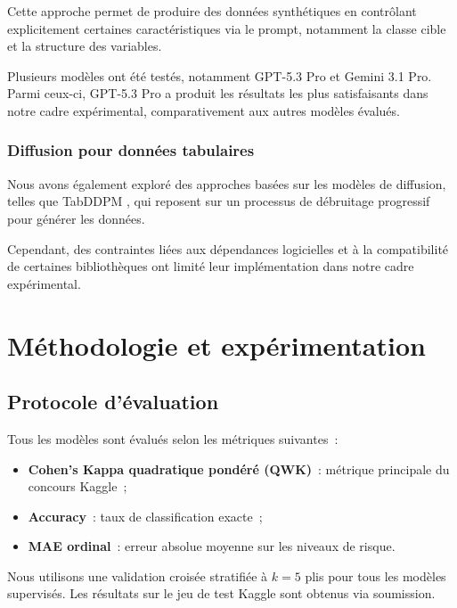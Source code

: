 \documentclass[conference]{IEEEtran}
\begin{document}
Cette approche permet de produire des données synthétiques en contrôlant explicitement certaines caractéristiques via le prompt, notamment la classe cible et la structure des variables.

Plusieurs modèles ont été testés, notamment GPT-5.3 Pro et Gemini 3.1 Pro. Parmi ceux-ci, GPT-5.3 Pro a produit les résultats les plus satisfaisants dans notre cadre expérimental, comparativement aux autres modèles évalués.\\

\subsubsection{\textbf{Diffusion pour données tabulaires}}

Nous avons également exploré des approches basées sur les modèles de diffusion, telles que TabDDPM \cite{kotelnikov2023tabddpm}, qui reposent sur un processus de débruitage progressif pour générer les données.

Cependant, des contraintes liées aux dépendances logicielles et à la compatibilité de certaines bibliothèques ont limité leur implémentation dans notre cadre expérimental.


\section{Méthodologie et expérimentation}
\label{sec:methodo}

\subsection{Protocole d'évaluation}

Tous les modèles sont évalués selon les métriques suivantes~:
\begin{itemize}
  \item \textbf{Cohen's Kappa quadratique pondéré (QWK)}~: métrique principale du concours Kaggle~;
  \item \textbf{Accuracy}~: taux de classification exacte~;
  \item \textbf{MAE ordinal}~: erreur absolue moyenne sur les niveaux de risque.
\end{itemize}

Nous utilisons une validation croisée stratifiée à $k=5$ plis pour tous les modèles supervisés.
Les résultats sur le jeu de test Kaggle sont obtenus via soumission.
\end{document}
